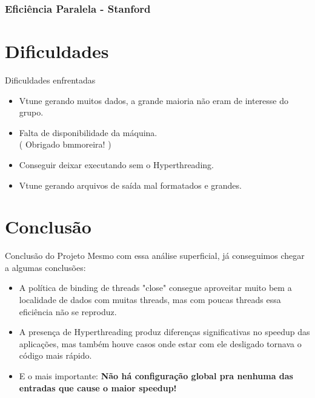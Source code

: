\documentclass{beamer}
\begin{document}
\begin{frame}
    \frametitle{Eficiência Paralela - Stanford}

    \begin{figure}
        \centering
    \end{figure}
\end{frame}

\section{Dificuldades}
\begin{frame}{Dificuldades enfrentadas}
 \begin{itemize}
     \item Vtune gerando muitos dados, a grande maioria não eram de interesse do grupo.
     \item Falta de disponibilidade da máquina. \\ ( Obrigado bmmoreira! )
     \item Conseguir deixar executando sem o Hyperthreading.
     \item Vtune gerando arquivos de saída mal formatados e grandes.
     
 \end{itemize}    
\end{frame}

\section{Conclusão}
\begin{frame}{Conclusão do Projeto}
Mesmo com essa análise superficial, já conseguimos chegar a algumas conclusões:
 \begin{itemize}
     \item A política de binding de threads "close" consegue aproveitar muito bem a localidade de dados com muitas threads, mas com poucas threads essa eficiência não se reproduz.
     \item A presença de Hyperthreading produz diferenças significativas no speedup das aplicações, mas também houve casos onde estar com ele desligado tornava o código mais rápido.
     \item E o mais importante: \textbf{Não há configuração global pra nenhuma das entradas que cause o maior speedup!}
     
 \end{itemize}    
\end{frame}
\end{document}
